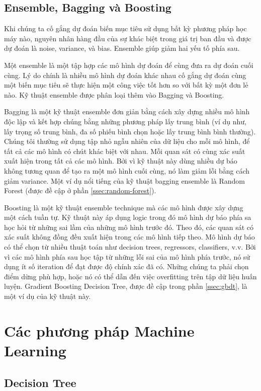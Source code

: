 \subsection{Ensemble, Bagging và Boosting}

Khi chúng ta cố gắng dự đoán biến mục tiêu sử dụng bất kỳ phương pháp học máy nào, nguyên nhân hàng đầu của sự khác biệt trong giá trị ban đầu và được dự đoán là noise, variance, và bias. Ensemble giúp giảm hai yếu tố phía sau.

Một ensemble là một tập hợp các mô hình dự đoán để cùng đưa ra dự đoán cuối cùng. Lý do chính là nhiều mô hình dự đoán khác nhau cố gắng dự đoán cùng một biến mục tiêu sẽ thực hiện một công việc tốt hơn so với bất kỳ một đơn lẻ nào. Kỹ thuật ensemble được phân loại thêm vào Bagging và Boosting.

Bagging là một kỹ thuật ensemble đơn giản bằng cách xây dựng nhiều mô hình độc lập và kết hợp chúng bằng những phương pháp lấy trung bình (ví dụ như, lấy trọng số trung bình, đa số phiếu bình chọn hoặc lấy trung bình bình thường). Chúng tôi thường sử dụng tập nhỏ ngẫu nhiên của dữ liệu cho mỗi mô hình, để tất cả các mô hình có chút khác biệt với nhau. Mỗi quan sát có cùng xác suất xuất hiện trong tất cả các mô hình. Bởi vì kỹ thuật này dùng nhiều dự báo không tương quan để tạo ra một mô hình cuối cùng, nó làm giảm lỗi bằng cách giảm variance. Một ví dụ nổi tiếng của kỹ thuật bagging ensemble là Random Forest (được đề cập ở phần \ref{ssec:random-forest}).

Boosting là một kỹ thuật ensemble technique mà các mô hình được xây dựng một cách tuần tự. Kỹ thuật này áp dụng logic trong đó mô hình dự báo phía sa học hỏi từ những sai lầm của những mô hình trước đó. Theo đó, các quan sát có xác suất không đồng đều xuất hiện trong các mô hình tiếp theo. Mô hình dự báo có thể chọn từ nhiều thuật toán như decision trees, regressors, classifiers, v.v. Bởi vì các mô hình phía sau học tập từ những lỗi sai của mô hình phía trước, nó sử dụng ít số iteration để đạt được độ chính xác đã có. Những chúng ta phải chọn điểm dừng phù hợp, hoặc nó có thể dẫn đến việc overfitting trên tập dữ liệu huấn luyện. Gradient Boosting Decision Tree, được đề cập trong phần \ref{ssec:gbdt}, là một ví dụ của kỹ thuật này.

\section{Các phương pháp Machine Learning}

\subsection{Decision Tree}
\label{ssec:decision-tree}

